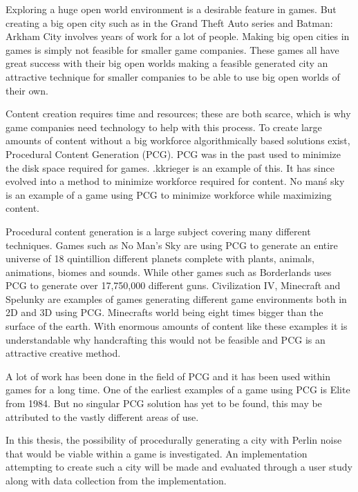 Exploring a huge open world environment is a desirable feature in games. But creating a big open city such as in the Grand Theft Auto series and Batman: Arkham City involves years of work for a lot of people. Making big open cities in games is simply not feasible for smaller game companies. These games all have great success with their big open worlds making a feasible generated city an attractive technique for smaller companies to be able to use big open worlds of their own.
\par
Content creation requires time and resources; these are both scarce, which is why game companies need technology to help with this process. To create large amounts of content without a big workforce algorithmically based solutions exist, Procedural Content Generation (PCG). PCG was in the past used to minimize the disk space required for games. .kkrieger is an  example of this. It has since evolved into a method to minimize workforce required for content. No man\'s sky is an example of a game using PCG to minimize workforce while maximizing content.
\par
Procedural content generation is a large subject covering many different techniques. Games such as No Man's Sky\cite{NoMansSky} are using PCG to generate an entire universe of 18 quintillion\cite{NoMansSkyplanets} different planets complete with plants, animals, animations, biomes and sounds. While other games such as Borderlands\cite{Borderlands} uses PCG to generate over 17,750,000 different guns\cite{BorderlandsWeapons}. Civilization IV\cite{CivilizationCompany}, Minecraft\cite{Minecraft} and Spelunky\cite{Spelunky} are examples of games generating different game environments both in 2D and 3D using PCG. Minecrafts world being eight times bigger than the surface of the earth\cite{MinecraftSize}. With enormous amounts of content like these examples it is understandable why handcrafting this would not be feasible and PCG is an attractive creative method.
\par
A lot of work has been done in the field of PCG and it has been used within games for a long time. One of the earliest examples of a game using PCG is Elite\cite{Elite} from 1984. But no singular PCG solution has yet to be found, this may be attributed to the vastly different areas of use.
\par
In this thesis, the possibility of procedurally generating a city with Perlin noise that would be viable within a game is investigated. An implementation attempting to create such a city will be made and evaluated through a user study along with data collection from the implementation.
	
